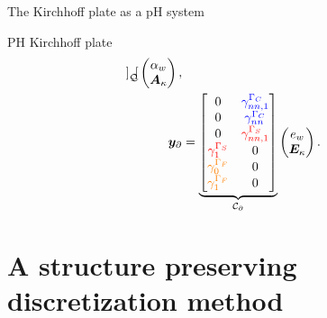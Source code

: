 \documentclass[aspectratio=169]{ISAE-Beamer}
\begin{document}
\begin{frame}{The Kirchhoff plate as a pH system}
\begin{block}{PH Kirchhoff plate}
\begin{equation*}
\begin{aligned}
{\begin{bmatrix}
		\end{bmatrix}}_{\mathcal{Q}}
		\begin{pmatrix}
		\alpha_w \\
		\bm{A}_{\kappa} \\
		\end{pmatrix}, \\
		\bm{y}_\partial &= \underbrace{
			\begin{bmatrix}
			{0} & \textcolor{blue}{\gamma_{nn, 1}^{\Gamma_C}} \\
			{0} & \textcolor{blue}{\gamma_{nn}^{\Gamma_C}} \\
			{0} & \textcolor{red}{\gamma_{nn, 1}^{\Gamma_S}} \\
			\textcolor{red}{\gamma_{1}^{\Gamma_S}} & {0} \\
			\textcolor{orange}{\gamma_{0}^{\Gamma_F}} & {0} \\
			\textcolor{orange}{\gamma_{1}^{\Gamma_F}} & {0} \\
			\end{bmatrix}}_{\mathcal{C}_\partial}
		\begin{pmatrix}
		e_w \\
		\bm{E}_{\kappa} \\
		\end{pmatrix}.
		\end{aligned}
		\end{equation*}
	\end{block}
\end{frame}





\section{A structure preserving discretization method}
\end{document}
